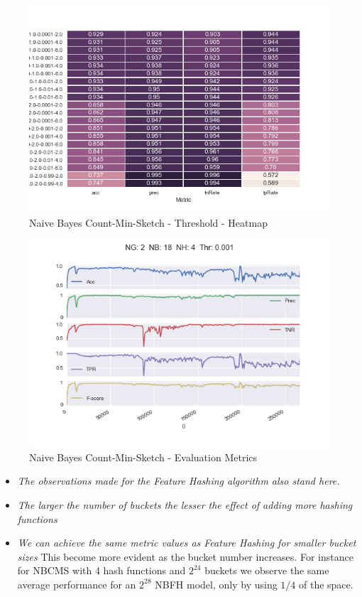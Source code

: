 \documentclass[12pt]{article}
\begin{document}
\begin{figure}[h]
    \centering
    \includegraphics[scale=0.8]{./SpamFilter/code/nbcmsthres}
    \caption{Naive Bayes Count-Min-Sketch - Threshold - Heatmap}
    \label{nbcmst}
\end{figure}


\begin{figure}[h]
    \centering
    \includegraphics[scale=0.8]{./SpamFilter/code/nbcmscurve}
    \caption{Naive Bayes Count-Min-Sketch - Evaluation Metrics} 
    \label{nbcmsc}
\end{figure}


\begin{itemize}
      \item 
        \textit{The observations made for the Feature Hashing algorithm also stand here.}

        \item
        \textit{The larger the number of buckets the lesser the effect of adding more hashing functions}

        \item
          \textit{We can achieve the same metric values as Feature Hashing for smaller bucket sizes} This become more evident as the bucket number increases. For instance for NBCMS with 4 hash functions and $2^{24}$ buckets we observe the same average performance for an $2^{28}$ NBFH model, only by using $1/4$ of the space. 


\end{itemize}
\end{document}
